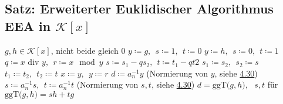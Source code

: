\documentclass[12pt,titlepage, pdf]{article}
\newcommand{\K}{\mathcal{K}}
\newcommand{\ggT}[1]{\textrm{ggT($#1$)}}
\renewcommand{\div}{\textrm{  div }}
\renewcommand{\>}{\rightarrow}
\renewcommand{\*}{\cdot}
\begin{document}
\subsection{Satz: Erweiterter Euklidischer Algorithmus EEA  in $\K[x]$}
\label{4.33}
	 \begin{algorithmic}[1]
	 	\algrenewcommand{}
	 	\algrenewcommand{}
	 	\Statex
	\Require $g,h\in \K[x]$, nicht beide gleich 0
	\State $y\coloneqq g,~~s\coloneqq 1,~~t\coloneqq0$
	\EndIf
	 \State $y\coloneqq h,~~s\coloneqq 0,~~t\coloneqq1$
	 \EndIf
	 \State $q\coloneqq x\div y,~~r\coloneqq x\mod y$
	 \State $s\coloneqq s_1-qs_2,~~t\coloneqq t_1-qt2$
	 \State $s_1\coloneqq s_2,~~s_2\coloneqq s$
	 \State $t_1\coloneqq t_2,~~t_2\coloneqq t$
	 \State $x\coloneqq y,~~y\coloneqq r$
	 \EndWhile
	 \EndIf
	 \State $d\coloneqq a^{-1}_ny$ (Normierung von $y$, siehe \hyperref[4.30]{4.30})
	 \State $s\coloneqq a^{-1}_ns,~~t\coloneqq a^{-1}_nt$ (Normierung von $s,t$, siehe \hyperref[4.30]{4.30})
	 \Ensure $d=\ggT{g,h},~~~s,t$ für $\ggT{g,h}=sh+tg$
 \end{algorithmic}
\end{document}
